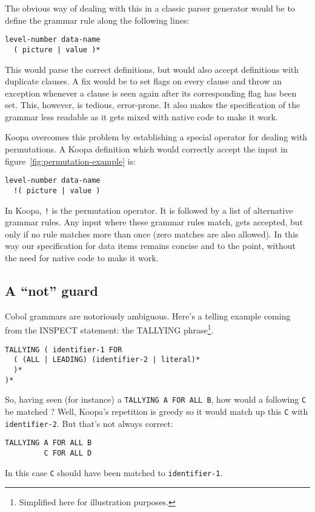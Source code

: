\documentclass[a4paper]{article}
\begin{document}
The obvious way of dealing with this in a classic parser generator would be to define the grammar rule along the following lines:
\begin{lstlisting}[numbers=none]
level-number data-name
  ( picture | value )*
\end{lstlisting}
This would parse the correct definitions, but would also accept definitions with duplicate clauses. A fix would be to set flags on every clause and throw an exception whenever a clause is seen again after its corresponding flag has been set. This, however, is tedious, error-prone. It also makes the specification of the grammar less readable as it gets mixed with native code to make it work.

Koopa overcomes this problem by establishing a special operator for dealing with permutations. A Koopa definition which would correctly accept the input in figure~\ref{fig:permutation-example} is:
\begin{lstlisting}[numbers=none]
level-number data-name
  !( picture | value )
\end{lstlisting}
In Koopa, \lstinline|!| is the permutation operator. It is followed by a list of alternative grammar rules. Any input where these grammar rules match, gets accepted, but only if no rule matches more than once (zero matches are also allowed). In this way our specification for data items remains concise and to the point, without the need for native code to make it work.


\subsection{A ``not'' guard}

Cobol grammars are notoriously ambiguous. Here's a telling example coming from the INSPECT statement: the TALLYING phrase\footnote{\scriptsize Simplified here for illustration purposes.}.
\begin{lstlisting}[numbers=none]
TALLYING ( identifier-1 FOR
  ( (ALL | LEADING) (identifier-2 | literal)*
  )*
)*
\end{lstlisting}
So, having seen (for instance) a \lstinline|TALLYING A FOR ALL B|, how would a following \lstinline|C| be matched ? Well, Koopa's repetition is greedy so it would match up this \lstinline|C| with \lstinline|identifier-2|. But that's not always correct: 
\begin{lstlisting}[numbers=none]
TALLYING A FOR ALL B
         C FOR ALL D
\end{lstlisting}
In this case \lstinline|C| should have been matched to \lstinline|identifier-1|.
\end{document}
